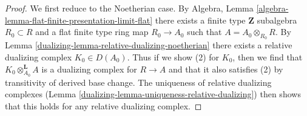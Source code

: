 \begin{proof}

We first reduce to the Noetherian case. By
Algebra, Lemma \ref{algebra-lemma-flat-finite-presentation-limit-flat}
there exists a finite type $\mathbf{Z}$ subalgebra $R_0 \subset R$
and a flat finite type ring map $R_0 \to A_0$ such that
$A = A_0 \otimes_{R_0} R$. By Lemma \ref{dualizing-lemma-relative-dualizing-noetherian}
there exists a relative
dualizing complex $K_0 \in D(A_0)$.
Thus if we show (2) for $K_0$, then we find that
$K_0 \otimes_{A_0}^\mathbf{L} A$ is
a dualizing complex for $R \to A$ and that it also satisfies (2)
by transitivity of derived base change.
The uniqueness of relative dualizing complexes
(Lemma \ref{dualizing-lemma-uniqueness-relative-dualizing})
then shows that this holds for
any relative dualizing complex.


\end{proof}
